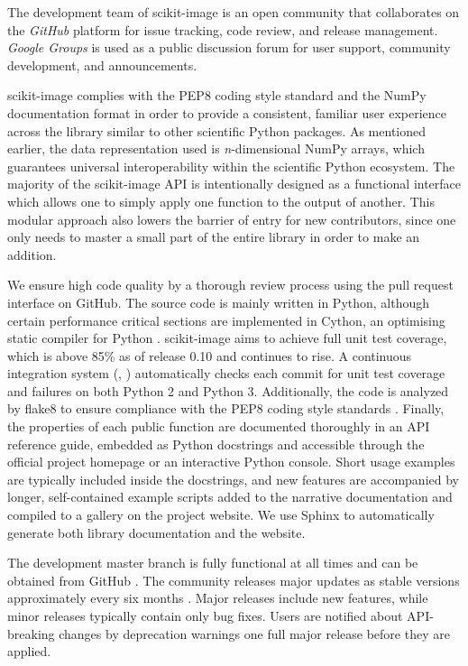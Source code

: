 \documentclass[fleqn,12pt]{wlpeerj}
\begin{document}
The development team of scikit-image is an open community that collaborates on
the \emph{GitHub} \cite{GitHub} platform for issue tracking, code review, and release
management. \emph{Google Groups} \cite{GoogleGroups} is used as a public discussion
forum for user support, community development, and announcements.

scikit-image complies with the PEP8 coding style standard \cite{PEP8} and the NumPy
documentation format \cite{NumpyDoc} in order to provide a consistent, familiar user
experience across the library similar to other scientific Python packages. As
mentioned earlier, the data representation used is \emph{n}-dimensional
NumPy arrays, which guarantees universal interoperability
within the scientific Python ecosystem. The majority of the scikit-image API is
intentionally designed as a functional interface which allows one to simply
apply one function to the output of another. This modular approach also lowers the
barrier of entry for new contributors, since one only needs to master a small
part of the entire library in order to make an addition.

We ensure high code quality by a thorough review process using the pull request
interface on GitHub. The source code is mainly written in Python, although
certain performance critical sections are implemented in Cython, an
optimising static compiler for Python
\cite{Cython}.  scikit-image aims to achieve full unit test coverage, which is above
85\% as of release 0.10 and continues to rise. A continuous integration system
(\cite{TravisCI}, \cite{Coveralls}) automatically checks each commit for unit test
coverage and failures on both Python 2 and Python 3. Additionally, the code is
analyzed by flake8 \cite{flake8} to ensure compliance with the PEP8 coding style
standards \cite{PEP8}. Finally, the properties of each public function are
documented thoroughly in an API reference guide, embedded as Python
docstrings and accessible through the official project homepage or an
interactive
Python console. Short usage examples are
typically included inside the docstrings, and new features are accompanied by longer,
self-contained example scripts added to the narrative documentation and
compiled to a gallery on the project website. We use Sphinx
\cite{Sphinx} to automatically generate both library documentation and the website.

The development master branch is fully functional at all times and can be
obtained from GitHub \cite{SourceCode}. The community releases major updates as
stable versions approximately every six months \cite{Versioning}. Major releases
include new features, while minor releases typically contain only bug fixes.
Users are notified about API-breaking changes by deprecation warnings one full
major release before they are applied.
\end{document}

